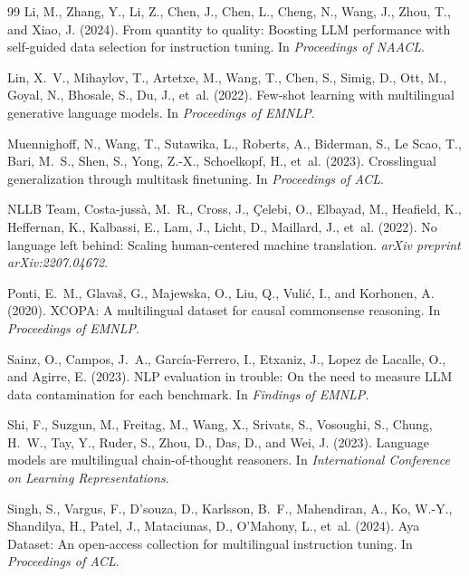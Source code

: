 \documentclass{article}
\begin{document}
\begin{thebibliography}{99}
Li, M., Zhang, Y., Li, Z., Chen, J., Chen, L., Cheng, N., Wang, J., Zhou, T., and Xiao, J. (2024).
From quantity to quality: Boosting LLM performance with self-guided data selection for instruction tuning.
In \textit{Proceedings of NAACL}.

Lin, X.~V., Mihaylov, T., Artetxe, M., Wang, T., Chen, S., Simig, D., Ott, M., Goyal, N., Bhosale, S., Du, J., et~al. (2022).
Few-shot learning with multilingual generative language models.
In \textit{Proceedings of EMNLP}.

Muennighoff, N., Wang, T., Sutawika, L., Roberts, A., Biderman, S., Le Scao, T., Bari, M.~S., Shen, S., Yong, Z.-X., Schoelkopf, H., et~al. (2023).
Crosslingual generalization through multitask finetuning.
In \textit{Proceedings of ACL}.

NLLB Team, Costa-juss\`a, M.~R., Cross, J., \c{C}elebi, O., Elbayad, M., Heafield, K., Heffernan, K., Kalbassi, E., Lam, J., Licht, D., Maillard, J., et~al. (2022).
No language left behind: Scaling human-centered machine translation.
\textit{arXiv preprint arXiv:2207.04672}.

Ponti, E.~M., Glava\v{s}, G., Majewska, O., Liu, Q., Vuli\'{c}, I., and Korhonen, A. (2020).
XCOPA: A multilingual dataset for causal commonsense reasoning.
In \textit{Proceedings of EMNLP}.

Sainz, O., Campos, J.~A., Garc\'{i}a-Ferrero, I., Etxaniz, J., Lopez de Lacalle, O., and Agirre, E. (2023).
NLP evaluation in trouble: On the need to measure LLM data contamination for each benchmark.
In \textit{Findings of EMNLP}.

Shi, F., Suzgun, M., Freitag, M., Wang, X., Srivats, S., Vosoughi, S., Chung, H.~W., Tay, Y., Ruder, S., Zhou, D., Das, D., and Wei, J. (2023).
Language models are multilingual chain-of-thought reasoners.
In \textit{International Conference on Learning Representations}.

Singh, S., Vargus, F., D'souza, D., Karlsson, B.~F., Mahendiran, A., Ko, W.-Y., Shandilya, H., Patel, J., Mataciunas, D., O'Mahony, L., et~al. (2024).
Aya Dataset: An open-access collection for multilingual instruction tuning.
In \textit{Proceedings of ACL}.


\end{thebibliography}
\end{document}
